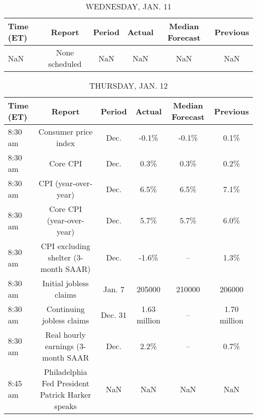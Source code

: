 \documentclass{article}%
\begin{document}
%


\begin{table}[htbp]%
\caption{WEDNESDAY, JAN. 11}%
\centering%
\begin{adjustbox}{width=1\textwidth}%
\begin{tabular}{lccccc}
\toprule
Time (ET) &         Report & Period & Actual & Median Forecast & Previous \\
\midrule
      NaN & None scheduled &    NaN &    NaN &             NaN &      NaN \\
\bottomrule
\end{tabular}
%
\end{adjustbox}%
\end{table}

%


\begin{table}[htbp]%
\caption{THURSDAY, JAN. 12}%
\centering%
\begin{adjustbox}{width=1\textwidth}%
\begin{tabular}{lccccc}
\toprule
Time (ET) &                                           Report &  Period &       Actual & Median Forecast &     Previous \\
\midrule
  8:30 am &                             Consumer price index &    Dec. &        -0.1\% &           -0.1\% &         0.1\% \\
  8:30 am &                                         Core CPI &    Dec. &         0.3\% &            0.3\% &         0.2\% \\
  8:30 am &                             CPI (year-over-year) &    Dec. &         6.5\% &            6.5\% &         7.1\% \\
  8:30 am &                        Core CPI (year-over-year) &    Dec. &         5.7\% &            5.7\% &         6.0\% \\
  8:30 am &             CPI excluding shelter (3-month SAAR) &    Dec. &        -1.6\% &              -- &         1.3\% \\
  8:30 am &                           Initial jobless claims &  Jan. 7 &       205000 &          210000 &       206000 \\
  8:30 am &                        Continuing jobless claims & Dec. 31 & 1.63 million &              -- & 1.70 million \\
  8:30 am &               Real hourly earnings (3-month SAAR &    Dec. &         2.2\% &              -- &         0.7\% \\
  8:45 am & Philadelphia Fed President Patrick Harker speaks &     NaN &          NaN &             NaN &          NaN \\

\end{tabular}
\end{adjustbox}
\end{table}
\end{document}
